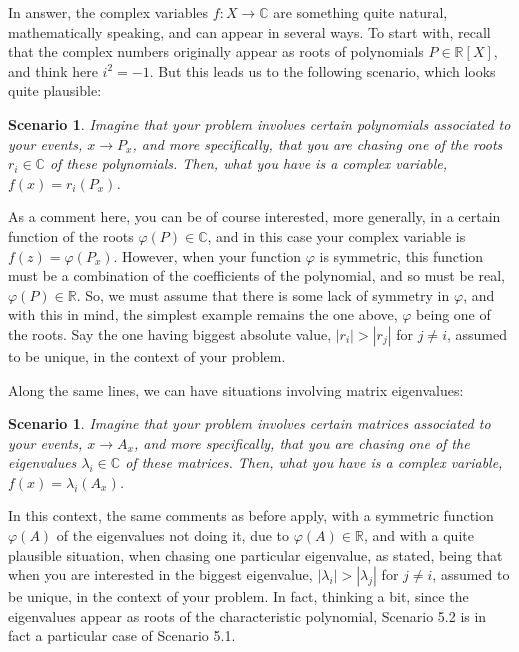 \documentclass[12pt]{amsbook}
\newtheorem{scenario}[theorem]{Scenario}
\begin{document}
\bigskip

In answer, the complex variables $f:X\to\mathbb C$ are something quite natural, mathematically speaking, and can appear in several ways. To start with, recall that the complex numbers originally appear as roots of polynomials $P\in\mathbb R[X]$, and think here $i^2=-1$. But this leads us to the following scenario, which looks quite plausible:

\begin{scenario}
Imagine that your problem involves certain polynomials associated to your events, $x\to P_x$, and more specifically, that you are chasing one of the roots $r_i\in\mathbb C$ of these polynomials. Then, what you have is a complex variable, $f(x)=r_i(P_x)$.
\end{scenario}

As a comment here, you can be of course interested, more generally, in a certain function of the roots $\varphi(P)\in\mathbb C$, and in this case your complex variable is $f(z)=\varphi(P_x)$. However, when your function $\varphi$ is symmetric, this function must be a combination of the coefficients of the polynomial, and so must be real, $\varphi(P)\in\mathbb R$. So, we must assume that there is some lack of symmetry in $\varphi$, and with this in mind, the simplest example remains the one above, $\varphi$ being one of the roots. Say the one having biggest absolute value, $|r_i|>|r_j|$ for $j\neq i$, assumed to be unique, in the context of your problem.

\bigskip

Along the same lines, we can have situations involving matrix eigenvalues:

\begin{scenario}
Imagine that your problem involves certain matrices associated to your events, $x\to A_x$, and more specifically, that you are chasing one of the eigenvalues $\lambda_i\in\mathbb C$ of these matrices. Then, what you have is a complex variable, $f(x)=\lambda_i(A_x)$.
\end{scenario}

In this context, the same comments as before apply, with a symmetric function $\varphi(A)$ of the eigenvalues not doing it, due to $\varphi(A)\in\mathbb R$, and with a quite plausible situation, when chasing one particular eigenvalue, as stated, being that when you are interested in the biggest eigenvalue, $|\lambda_i|>|\lambda_j|$ for $j\neq i$, assumed to be unique, in the context of your problem. In fact, thinking a bit, since the eigenvalues appear as roots of the characteristic polynomial, Scenario 5.2 is in fact a particular case of Scenario 5.1.
\end{document}
